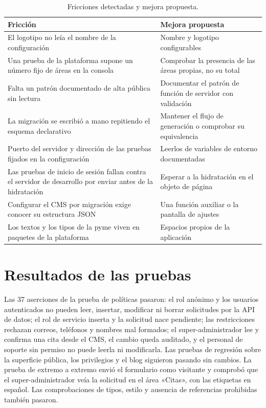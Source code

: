 \begin{table}[htbp]
  \centering
  \footnotesize
  \caption{Fricciones detectadas y mejora propuesta.}
  \label{tab:eval-fricciones}
  \begin{tabularx}{\textwidth}{@{}>{\raggedright\arraybackslash}p{6.2cm}X@{}}
    \toprule
    \textbf{Fricción} & \textbf{Mejora propuesta} \\
    \midrule
    El logotipo no leía el nombre de la configuración & Nombre y logotipo
      configurables \\
    Una prueba de la plataforma supone un número fijo de áreas en la
      consola & Comprobar la presencia de las áreas propias, no su total \\
    Falta un patrón documentado de alta pública sin lectura & Documentar el
      patrón de función de servidor con validación \\
    La migración se escribió a mano repitiendo el esquema declarativo &
      Mantener el flujo de generación o comprobar su equivalencia \\
    Puerto del servidor y dirección de las pruebas fijados en la
      configuración & Leerlos de variables de entorno documentadas \\
    Las pruebas de inicio de sesión fallan contra el servidor de desarrollo
      por enviar antes de la hidratación & Esperar a la hidratación en el
      objeto de página \\
    Configurar el CMS por migración exige conocer su estructura JSON &
      Una función auxiliar o la pantalla de ajustes \\
    Los textos y los tipos de la pyme viven en paquetes de la plataforma &
      Espacios propios de la aplicación \\
    \bottomrule
  \end{tabularx}
\end{table}

\section{Resultados de las pruebas}
\label{sec:eval-pruebas}

Las 37 aserciones de la prueba de políticas pasaron: el rol anónimo y los
usuarios autenticados no pueden leer, insertar, modificar ni borrar
solicitudes por la API de datos; el rol de servicio inserta y la solicitud
nace pendiente; las restricciones rechazan correos, teléfonos y nombres mal
formados; el super-administrador lee y confirma una cita desde el CMS, el
cambio queda auditado, y el personal de soporte sin permiso no puede leerla
ni modificarla. Las pruebas de regresión sobre la superficie pública, los
privilegios y el blog siguieron pasando sin cambios. La prueba de extremo a
extremo envió el formulario como visitante y comprobó que el
super-administrador veía la solicitud en el área «Citas», con las etiquetas
en español. Las comprobaciones de tipos, estilo y ausencia de referencias
prohibidas también pasaron.

